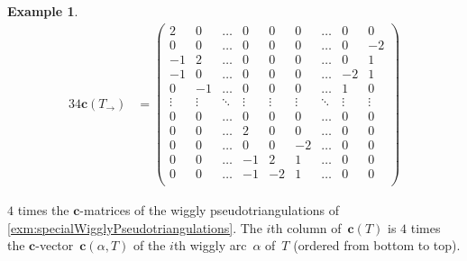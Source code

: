 \documentclass{amsart}
\theoremstyle{definition}
\newtheorem{example}[theorem]{Example}
\renewcommand{\b}[1]{{\boldsymbol{#1}}} %
\begin{document}
\begin{example}
\begin{table}
\begin{alignat*}{3}
	4\b{c}(T_\rightarrow) & = \begin{pmatrix}
		2 & 0 & \dots & 0 & 0 & 0 & \dots & 0 & 0 \\
		0 & 0 & \dots & 0 & 0 & 0 & \dots & 0 & -2 \\
		-1 & 2 & \dots & 0 & 0 & 0 & \dots & 0 & 1 \\
		-1 & 0 & \dots & 0 & 0 & 0 & \dots & -2 & 1 \\
		0 & -1 & \dots & 0 & 0 & 0 & \dots & 1 & 0 \\
		\vdots & \vdots & \ddots & \vdots & \vdots & \vdots & \ddots & \vdots & \vdots \\
		0 & 0 & \dots & 0 & 0 & 0 & \dots & 0 & 0 \\
		0 & 0 & \dots & 2 & 0 & 0 & \dots & 0 & 0 \\
		0 & 0 & \dots & 0 & 0 & -2 & \dots & 0 & 0 \\
		0 & 0 & \dots & -1 & 2 & 1 & \dots & 0 & 0 \\
		0 & 0 & \dots & -1 & -2 & 1 & \dots & 0 & 0 \\
	\end{pmatrix}
	\end{alignat*}
	\endgroup
	\caption{$4$ times the $\b{c}$-matrices of the wiggly pseudotriangulations of \cref{exm:specialWigglyPseudotriangulations}. The $i$th column of~$\b{c}(T)$ is $4$ times the $\b{c}$-vector~$\b{c}(\alpha, T)$ of the $i$th wiggly arc~$\alpha$ of~$T$ (ordered from bottom to top).}
	\label{table:specialCMatrices}
\end{table}
\end{example}
\end{document}
